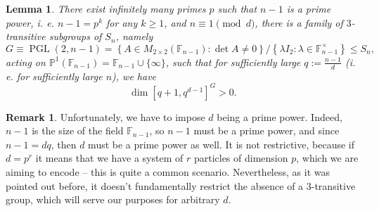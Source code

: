 \documentclass[11pt,letterpaper]{article}
\theoremstyle{plain}
\theoremstyle{plain}
\theoremstyle{plain}
\theoremstyle{plain}
\theoremstyle{plain}
\theoremstyle{plain}
\theoremstyle{plain}
\newtheorem{smlemma}[smtheorem]{Lemma}
\theoremstyle{definition}
\newtheorem{smremark}[smtheorem]{Remark}
\theoremstyle{plain}
\begin{document}
\begin{smlemma} \label{lem:3_transitive_subgroup}
    There exist infinitely many primes $p$ such that $n-1$ is a prime power, i. e. $n-1=p^k$ for any $k\geq 1$, and $n\equiv 1 \pmod{d}$, there is a family of $3$-transitive subgroups of $S_n$, namely
    \begin{equation}\label{eq:3_transitive_subgroup}
        G\equiv\operatorname{PGL}(2, n-1)=\left\{A \in M_{2 \times 2}\left(\mathbb{F}_{n-1}\right): \operatorname{det} A \neq 0\right\}/\left\{\lambda I_2: \lambda \in \mathbb{F}_{n-1}^{\times}\right\}\leq S_n,
    \end{equation}
    acting on $\mathbb{P}^1\left(\mathbb{F}_{n-1}\right)=\mathbb{F}_{n-1} \cup\{\infty\}$, such that for sufficiently large $q:=\frac{n-1}{d}$ (i. e. for sufficiently large $n$), we have 
    \[\dim [q+1, q^{d-1}]^G > 0.\]
\end{smlemma}

\begin{smremark}
    Unfortunately, we have to impose $d$ being a prime power. Indeed, $n-1$ is the size of the field $\mathbb{F}_{n-1}$, so $n-1$ must be a prime power,
    and since $n-1=d q$, then $d$ must be a prime power as well. It is not restrictive, because if $d=p^r$ it means that we have a system of $r$ particles
    of dimension $p$, which we are aiming to encode -- this is quite a common scenario.
    Nevertheless, as it was pointed out before, it doesn't fundamentally restrict the absence of a 3-transitive group, which will serve our purposes
    for arbitrary $d$.
\end{smremark}
\end{document}

